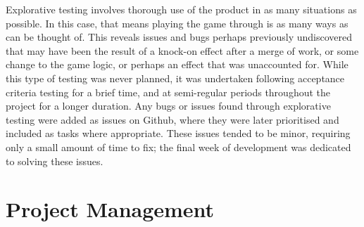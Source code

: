\documentclass[12pt]{article}
\begin{document}
Explorative testing involves thorough use of the product in as many situations as possible. In this case, that means playing the game through is as many ways as can be thought of. This reveals issues and bugs perhaps previously undiscovered that may have been the result of a knock-on effect after a merge of work, or some change to the game logic, or perhaps an effect that was unaccounted for. While this type of testing was never planned, it was undertaken following acceptance criteria testing for a brief time, and at semi-regular periods throughout the project for a longer duration. Any bugs or issues found through explorative testing were added as issues on Github, where they were later prioritised and included as tasks where appropriate. These issues tended to be minor, requiring only a small amount of time to fix; the final week of development was dedicated to solving these issues. 


\section{Project Management}
\end{document}
